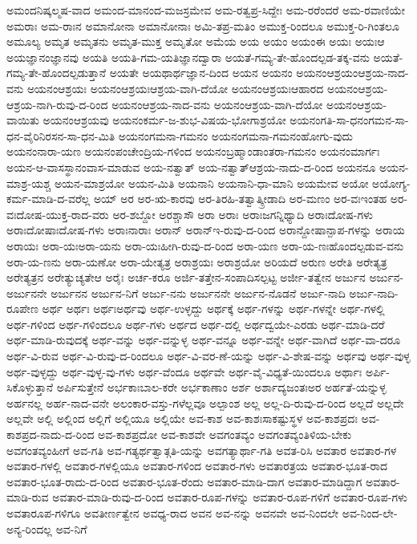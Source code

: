 {ಅಮಂದನಿಷ್ಕಲ್ಮಷ-ವಾದ
ಅಮಂದ-ಮಾನಂದ-ಮಜಸ್ರಮೇವ
ಅಮ-ರತ್ವಪ್ರ-ಸಿದ್ದೇಃ
ಅಮ-ರರೆಂದರೆ
ಅಮ-ರವಾಣಿಯೇ
ಅಮರಾಃ
ಅಮ-ರಾಃನ
ಅಮಾನೋನಾ
ಅಮಾನೋನಾಃ
ಅಮಿ-ತಪ್ರ-ಮತಿಂ
ಅಮುಕ್ತ-ರಿಂದಲೂ
ಅಮುಕ್ತ-ರಿ-ಗಿಂತಲೂ
ಅಮೂಲ್ಯ
ಅಮೃತ
ಅಮೃತನು
ಅಮೃತ-ಮುಕ್ತ
ಅಮೃತೋ
ಅಮೆಯ
ಅಯ
ಅಯಂ
ಅಯಂಈ
ಅಯಃ
ಅಯಃಆ
ಅಯಜ್ಞಾನಂಜ್ಞಾನವು
ಅಯತಿ
ಅಯತಿ-ಗಮ-ಯತಿಜ್ಞಾನದ್ವಾರಾ
ಅಯತೆ-ಗಮ್ಯ-ತೇ-ಹೊಂದಲ್ಪಡ-ತಕ್ಕ-ವನು
ಅಯತೆ-ಗಮ್ಯ-ತೇ-ಹೊಂದಲ್ಪಡುತ್ತಾನೆ
ಅಯತೇ
ಅಯಥಾರ್ಥಜ್ಞಾನ-ದಿಂದ
ಅಯನ
ಅಯನಂ
ಅಯನಂಆಶ್ರಯಂಆಶ್ರಯ-ನಾದ-ವನು
ಅಯನಂಆಶ್ರಯಃ
ಅಯನಂಆಶ್ರಯಃಆಶ್ರಯ-ವಾಗಿ-ದೆಯೋ
ಅಯನಂಆಶ್ರಯಃಆಹಾರದ
ಅಯನಂಆಶ್ರಯ-ಆಶ್ರಯ-ನಾಗಿ-ರುವು-ದ-ರಿಂದ
ಅಯನಂಆಶ್ರಯ-ನಾದ-ವನು
ಅಯನಂಆಶ್ರಯ-ವಾಗಿ-ದೆಯೋ
ಅಯನಂಆಶ್ರಯ-ವಾಯಿತು
ಅಯನಂಆಶ್ರಯವು
ಅಯನಂಕರ್ಮ-ಜ-ಶುಭ-ವಿಷಯ-ಭೋಗಾಶ್ರಯೋ
ಅಯನಂಗತಿ-ಸಾ-ಧನಂಗಮನ-ಸಾ-ಧನ-ವೈರಿನಿರಸನ-ಸಾ-ಧನ-ಮಿತಿ
ಅಯನಂಗಮನಾ-ಗಮನಂ
ಅಯನಂಗಮನಾ-ಗಮನಂಹೋಗು-ವುದು
ಅಯನಂನಾರಾ-ಯಣ
ಅಯನಂಪಂಚೇಂದ್ರಿಯ-ಗಳಿಂದ
ಅಯನಂಬ್ರಹ್ಮಾಂಡಾಂತರಾ-ಗಮನಂ
ಅಯನಂಮಾರ್ಗಃ
ಅಯನ-ಆ-ವಾಸಸ್ಥಾನಂವಾಸ-ಮಾಡುವ
ಅಯ-ನತ್ವಾತ್
ಅಯ-ನತ್ವಾತ್ಆಶ್ರಯ-ನಾದು-ದ-ರಿಂದ
ಅಯನನೂ
ಅಯನ-ಮಾಶ್ರ-ಯಶ್ಚ
ಅಯನ-ಮಾಶ್ರಯೋ
ಅಯನ-ಮಿತಿ
ಅಯನಾನಿ
ಅಯನಾನಿ-ಧಾ-ಮಾನಿ
ಅಯಮೇವ
ಅಯೋ
ಅಯೋಗ್ಯ-ಕರ್ಮ-ಮಾಡಿ-ದ-ವರೆಲ್ಲ
ಅಯ್
ಅರ
ಅರ-ಋ-ಕಾರವು
ಅರ-ತಿರಹಿ-ತತ್ವಾತ್ಕ್ರೀಡಾದಿ
ಅರ-ಮಣಂ
ಅರ-ವಃಇಂತಹ
ಅರ-ವಃದೋಷ-ಯುಕ್ತ-ರಾದ-ವರು
ಅರ-ಶಬ್ದೋ
ಅರಶ್ಚಾಸೌ
ಅರಾ
ಅರಾಃ
ಅರಾಃಜಗನ್ನಿಥ್ಯಾದಿ
ಅರಾಃದೋಷ-ಗಳು
ಅರಾಃದೋಷಾಃದೋಷ-ಗಳು
ಅರಾಃನಾರಾಃ
ಅರಾನ್
ಅರಾನ್ಇ-ರುವು-ದ-ರಿಂದ
ಅರಾನ್ದೋಷಾನ್ಪಾಪ-ಗಳನ್ನು
ಅರಾಯ
ಅರಾಯಃ
ಅರಾ-ಯಃಅರಾ-ಯನು
ಅರಾ-ಯಃಹೀಗಿ-ರುವು-ದ-ರಿಂದ
ಅರಾ-ಯಣ
ಅರಾ-ಯ-ಣಃಹೊಂದಲ್ಪಡುವ-ವನು
ಅರಾ-ಯ-ಣನು
ಅರಾ-ಯಣೋ
ಅರಾ-ಯೇತ್ಯತ್ರ
ಅರಾಶ್ರಯಃ
ಅರಾಶ್ರಯೋ
ಅರಿಯದೆ
ಅರುಣ
ಅರೇತಿ
ಅರೇತ್ಯತ್ರ
ಅರೇತ್ಯತ್ರನ
ಅರೇತ್ಯುಚ್ಯತೇಆ
ಅರೈಃ
ಅರ್ಚ-ಕರೂ
ಅರ್ಜಿ-ತತ್ತೇನ-ಸಂಪಾದಿಸಲ್ಪಟ್ಟ
ಅರ್ಜೀ-ತತ್ವೇನ
ಅರ್ಜುನ
ಅರ್ಜುನ-ಅರ್ಜುನನೇ
ಅರ್ಜುನನ
ಅರ್ಜುನ-ನಿಗೆ
ಅರ್ಜು-ನನು
ಅರ್ಜುನನೇ
ಅರ್ಜುನ-ನೊಡನೆ
ಅರ್ಜು-ನಾದಿ
ಅರ್ಜು-ನಾದಿ-ರೂಪೇಣ
ಅರ್ಥ
ಅರ್ಥಃ
ಅರ್ಥಃಅರ್ಥವು
ಅರ್ಥ-ಉಳ್ಳದ್ದು
ಅರ್ಥಕ್ಕೆ
ಅರ್ಥ-ಗಳನ್ನು
ಅರ್ಥ-ಗಳನ್ನೇ
ಅರ್ಥ-ಗಳಲ್ಲಿ
ಅರ್ಥ-ಗಳಿಂದ
ಅರ್ಥ-ಗಳಿಂದಲೂ
ಅರ್ಥ-ಗಳು
ಅರ್ಥದ
ಅರ್ಥ-ದಲ್ಲಿ
ಅರ್ಥದ್ವಯೇ-ಎರಡು
ಅರ್ಥ-ಮಾಡಿ-ದರೆ
ಅರ್ಥ-ಮಾಡಿ-ರುವುದಕ್ಕೆ
ಅರ್ಥ-ವನ್ನು
ಅರ್ಥ-ವನ್ನುಳ್ಳ
ಅರ್ಥ-ವನ್ನೂ
ಅರ್ಥ-ವನ್ನೇ
ಅರ್ಥ-ವಾಗಿದೆ
ಅರ್ಥ-ವಾ-ದರೂ
ಅರ್ಥ-ವಿ-ರುವ
ಅರ್ಥ-ವಿ-ರುವು-ದ-ರಿಂದಲೂ
ಅರ್ಥ-ವಿ-ವರ-ಣೆ-ಯನ್ನು
ಅರ್ಥ-ವಿ-ಶೇಷ-ವನ್ನು
ಅರ್ಥವು
ಅರ್ಥ-ವುಳ್ಳ
ಅರ್ಥ-ವುಳ್ಳದ್ದು
ಅರ್ಥ-ವುಳ್ಳ-ವು-ಗಳು
ಅರ್ಥ-ವೆಂದೂ
ಅರ್ಥವೇ
ಅರ್ಥ-ವೈ-ವಿಧ್ಯತೆ-ಯಿಂದಲೂ
ಅರ್ಥಾಃ
ಅರ್ಪಿ-ಸಿಕೊಳ್ಳುತ್ತಾನೆ
ಅರ್ಪಿಸುತ್ತೇನೆ
ಅರ್ಭಕಾಃಬಾಲ-ಕರೇ
ಅರ್ಭಕಾಣಾಂ
ಅರ್ಶ
ಅರ್ಶಾದ್ಯಜಂತಃಅರ
ಅರ್ಹತೆ-ಯನ್ನುಳ್ಳ
ಅರ್ಹನಲ್ಲ
ಅರ್ಹ-ನಾದ-ವನೇ
ಅಲಂಕಾರ-ವಸ್ತು-ಗಳೆಲ್ಲವೂ
ಅಲ್ಪಾಂಶ
ಅಲ್ಲ
ಅಲ್ಲ-ದಿ-ರುವು-ದ-ರಿಂದ
ಅಲ್ಲದೆ
ಅಲ್ಲದೇ
ಅಲ್ಲವೇ
ಅಲ್ಲಿ
ಅಲ್ಲಿಂದ
ಅಲ್ಲಿಗೆ
ಅಲ್ಲಿಯೂ
ಅಲ್ಲಿಯೇ
ಅವ-ಕಾಶ
ಅವ-ಕಾಶಃಸಾಕಷ್ಟುಸ್ಥಳ
ಅವ-ಕಾಶಪ್ರದಃ
ಅವ-ಕಾಶಪ್ರದ-ನಾದು-ದ-ರಿಂದ
ಅವ-ಕಾಶಪ್ರದೋ
ಅವ-ಕಾಶವೇ
ಅವಗಂತವ್ಯಂ
ಅವಗಂತವ್ಯಂತಿಳಿಯ-ಬೇಕು
ಅವಗಂತವ್ಯಂಹೀಗೆ
ಅವ-ಗತಿ
ಅವ-ಗತ್ಯರ್ಥತ್ವಾತ್ಗತಿ-ಯನ್ನು
ಅವಗತ್ಯಾರ್ಥಾ-ಗತಿ
ಅವತ-ರಿಸಿ
ಅವತಾರ
ಅವತಾರ-ಗಳ
ಅವತಾರ-ಗಳಲ್ಲಿ
ಅವತಾರ-ಗಳಲ್ಲಿಯೂ
ಅವತಾರ-ಗಳಿಂದ
ಅವತಾರ-ಗಳು
ಅವತಾರತ್ರಯ
ಅವತಾರ-ಭೂತ-ರಾದ
ಅವತಾರ-ಭೂತ-ರಾದು-ದ-ರಿಂದ
ಅವತಾರ-ಭೂತ-ರೆಂದು
ಅವತಾರ-ಮಾಡಿ-ದಾಗ
ಅವತಾರ-ಮಾಡಿದ್ದಾಗ
ಅವತಾರ-ಮಾಡಿ-ರುವ
ಅವತಾರ-ಮಾಡಿ-ರುವು-ದ-ರಿಂದ
ಅವತಾರ-ರೂಪ-ಗಳನ್ನು
ಅವತಾರ-ರೂಪ-ಗಳಿಗೆ
ಅವತಾರ-ರೂಪ-ಗಳು
ಅವತಾರೂಪ-ಗಳಿಗೂ
ಅವತೀರ್ಣತ್ವೇನ
ಅವಧ್ಯ-ರಾದ
ಅವನ
ಅವ-ನನ್ನು
ಅವನವೇ
ಅವ-ನಿಂದಲೇ
ಅವ-ನಿಂದ-ಲೇ-ಅನ್ಯ-ರಿಂದಲ್ಲ
ಅವ-ನಿಗೆ
}
